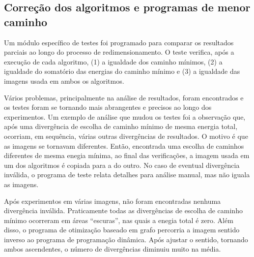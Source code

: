 \subsection{Correção dos algoritmos e programas de menor caminho}

Um módulo específico de testes foi programado
para comparar os resultados parciais 
ao longo do processo de redimensionamento.
O teste verifica, após a execução de cada algoritmo,
(1) a igualdade dos caminho mínimos,
(2) a igualdade do somatório das energias do caminho mínimo e
(3) a igualdade das imagens usada em ambos os algoritmos.

Vários problemas, principalmente na análise de resultados,
foram encontrados e os testes foram
se tornando mais abrangentes e precisos ao longo dos experimentos.
Um exemplo de análise que mudou os testes foi a observação que,
após uma divergência de escolha de caminho mínimo de mesma energia total,
ocorriam, em sequência, várias outras divergências de resultados.
O motivo é que as imagens se tornavam diferentes.
Então, encontrada uma escolha de caminhos diferentes 
de mesma enegia mínima,
ao final das verificações, 
a imagem usada em um dos algoritmos é copiada para a do outro.
No caso de eventual divergência inválida, 
o programa de teste relata detalhes para análise manual, 
mas não iguala as imagens.

Após experimentos em várias imagens,
não foram encontradas nenhuma divergência inválida.
Praticamente todas as divergências de escolha de caminho mínimo
ocorreram em áreas ``escuras'', nas quais a enegia total é zero.
Além disso, o programa de otimização baseado em grafo
percorria a imagem sentido inverso ao programa de programação dinâmica.
Após ajustar o sentido, tornando ambos ascendentes, 
o número de divergências diminuiu muito na média.